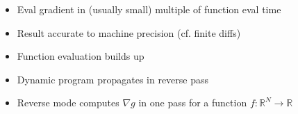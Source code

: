 \documentclass[10pt]{report}
\begin{document}
%
\begin{itemize}
\item Eval gradient in (usually small) multiple of function eval time
%
\item Result accurate to machine precision (cf. finite diffs)
\item Function evaluation builds up 
\item Dynamic program propagates  in reverse pass
\item Reverse mode computes $\nabla g$ in one
  pass for a function $f : \mathbb{R}^N \rightarrow \mathbb{R}$
\end{itemize}
\end{document}
